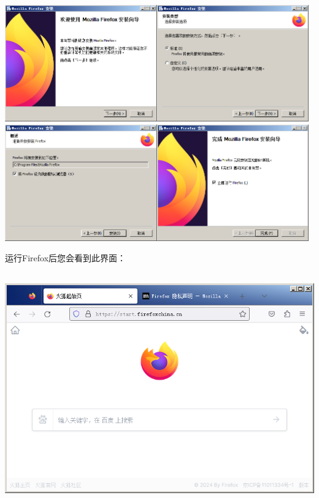 \includegraphics[width=2.57907in,height=1.97917in]{media/image5.png}\includegraphics[width=2.57874in,height=1.97891in]{media/image6.png}\includegraphics[width=2.57874in,height=1.97891in]{media/image7.png}\includegraphics[width=2.57914in,height=1.97922in]{media/image8.png}

运行Firefox后您会看到此界面：

\includegraphics[width=5.76806in,height=3.92214in]{media/image9.png}
